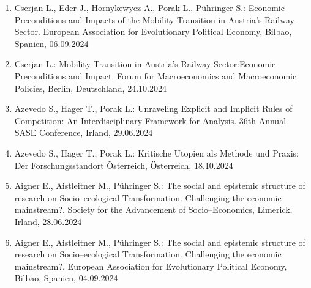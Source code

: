 \begin{enumerate}
	\item Cserjan L., Eder J., Hornykewycz A., Porak L., Pühringer S.: Economic Preconditions and Impacts of the Mobility Transition in Austria's Railway Sector. European Association for Evolutionary Political Economy, Bilbao, Spanien, 06.09.2024
	\item Cserjan L.: Mobility Transition in Austria’s Railway Sector:Economic Preconditions and Impact. Forum for Macroeconomics and Macroeconomic Policies, Berlin, Deutschland, 24.10.2024
	\item Azevedo S., Hager T., Porak L.: Unraveling Explicit and Implicit Rules of Competition: An Interdisciplinary Framework for Analysis. 36th Annual SASE Conference, Irland, 29.06.2024
	\item Azevedo S., Hager T., Porak L.: Kritische Utopien als Methode und Praxis: Der Forschungsstandort Österreich, Österreich, 18.10.2024
	\item Aigner E., Aistleitner M., Pühringer S.: The social and epistemic structure of research on Socio--ecological Transformation. Challenging the economic mainstream?. Society for the Advancement of Socio--Economics, Limerick, Irland, 28.06.2024
	\item Aigner E., Aistleitner M., Pühringer S.: The social and epistemic structure of research on Socio--ecological Transformation. Challenging the economic mainstream?. European Association for Evolutionary Political Economy, Bilbao, Spanien, 04.09.2024
\end{enumerate}
